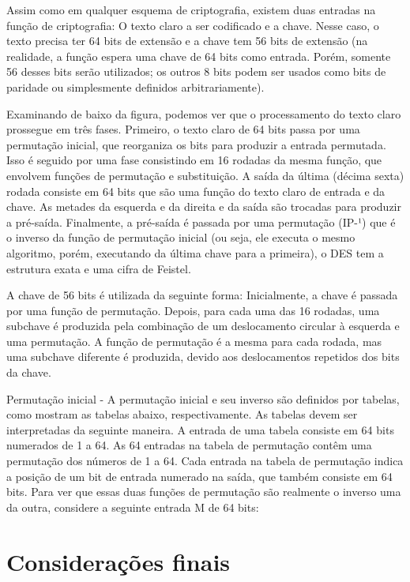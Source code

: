 \documentclass[
	article,			%
	12pt,				%
	oneside,			%
	a4paper,			%
	english,			%
	brazil,				%
	sumario=tradicional
	]{abntex2}
\begin{document}
Assim como em qualquer esquema de criptografia, existem duas entradas na função de criptografia: O texto claro a ser codificado e a chave. Nesse caso, o texto precisa ter 64 bits de extensão e a chave tem 56 bits de extensão (na realidade, a função espera uma chave de 64 bits como entrada. Porém, somente 56 desses bits serão utilizados; os outros 8 bits podem ser usados como bits de paridade ou simplesmente definidos arbitrariamente).

Examinando de baixo da figura, podemos ver que o processamento do texto claro prossegue em três fases. Primeiro, o texto claro de 64 bits passa por uma permutação inicial, que reorganiza os bits para produzir a entrada permutada. Isso é seguido por uma fase consistindo em 16 rodadas da mesma função, que envolvem funções de permutação e substituição. A saída da última (décima sexta) rodada consiste em 64 bits que são uma função do texto claro de entrada e da chave. As metades da esquerda e da direita e da saída são trocadas para produzir a pré-saída. Finalmente, a pré-saída é passada por uma permutação (IP-¹) que é o inverso da função de permutação inicial (ou seja, ele executa o mesmo algoritmo, porém, executando da última chave para a primeira), o DES tem a estrutura exata e uma cifra de Feistel.

A chave de 56 bits é utilizada da seguinte forma: Inicialmente, a chave é passada por uma função de permutação. Depois, para cada uma das 16 rodadas, uma subchave é produzida pela combinação de um deslocamento circular à esquerda e uma permutação. A função de permutação é a mesma para cada rodada, mas uma subchave diferente é produzida, devido aos deslocamentos repetidos dos bits da chave.

Permutação inicial - A permutação inicial e seu inverso são definidos por tabelas, como mostram as tabelas abaixo, respectivamente. As tabelas devem ser interpretadas da seguinte maneira. A entrada de uma tabela consiste em 64 bits numerados de 1 a 64. As 64 entradas na tabela de permutação contêm uma permutação dos números de 1 a 64. Cada entrada na tabela de permutação indica a posição de um bit de entrada numerado na saída, que também consiste em 64 bits. Para ver que essas duas funções de permutação são realmente o inverso uma da outra, considere a seguinte entrada M de 64 bits:


\section*{Considerações finais}
\end{document}
